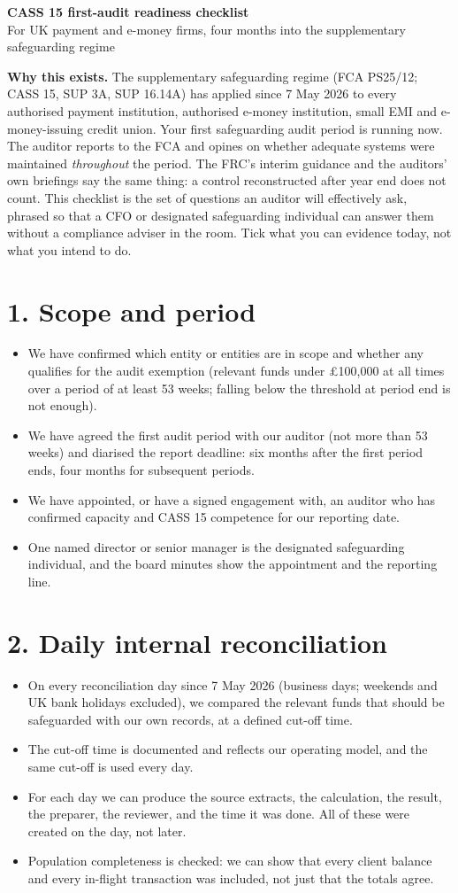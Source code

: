 \documentclass[a4paper,10.5pt]{article}
\newcommand{\q}[1]{\item[$\square$] #1}
\begin{document}
{\LARGE\bfseries CASS 15 first-audit readiness checklist}\\[1mm]
{\large For UK payment and e-money firms, four months into the supplementary safeguarding regime}

\vspace{2mm}
\textbf{Why this exists.} The supplementary safeguarding regime (FCA PS25/12; CASS 15, SUP 3A, SUP 16.14A) has applied since 7 May 2026 to every authorised payment institution, authorised e-money institution, small EMI and e-money-issuing credit union. Your first safeguarding audit period is running now. The auditor reports to the FCA and opines on whether adequate systems were maintained \emph{throughout} the period. The FRC's interim guidance and the auditors' own briefings say the same thing: a control reconstructed after year end does not count. This checklist is the set of questions an auditor will effectively ask, phrased so that a CFO or designated safeguarding individual can answer them without a compliance adviser in the room. Tick what you can evidence today, not what you intend to do.

\section*{1. Scope and period}
\begin{itemize}
\q{We have confirmed which entity or entities are in scope and whether any qualifies for the audit exemption (relevant funds under \pounds100{,}000 at all times over a period of at least 53 weeks; falling below the threshold at period end is not enough).}
\q{We have agreed the first audit period with our auditor (not more than 53 weeks) and diarised the report deadline: six months after the first period ends, four months for subsequent periods.}
\q{We have appointed, or have a signed engagement with, an auditor who has confirmed capacity and CASS 15 competence for our reporting date.}
\q{One named director or senior manager is the designated safeguarding individual, and the board minutes show the appointment and the reporting line.}
\end{itemize}

\section*{2. Daily internal reconciliation}
\begin{itemize}
\q{On every reconciliation day since 7 May 2026 (business days; weekends and UK bank holidays excluded), we compared the relevant funds that should be safeguarded with our own records, at a defined cut-off time.}
\q{The cut-off time is documented and reflects our operating model, and the same cut-off is used every day.}
\q{For each day we can produce the source extracts, the calculation, the result, the preparer, the reviewer, and the time it was done. All of these were created on the day, not later.}
\q{Population completeness is checked: we can show that every client balance and every in-flight transaction was included, not just that the totals agree.}
\end{itemize}
\end{document}
